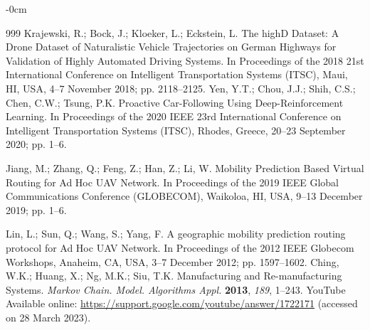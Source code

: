 \documentclass[sensors,article,accept,moreauthors,pdftex]{Definitions/mdpi}
\begin{document}
\begin{adjustwidth}{-\extralength}{0cm}
\begin{thebibliography}{999}
Krajewski, R.; Bock, J.; Kloeker, L.; Eckstein, L. The highD Dataset: A Drone Dataset of Naturalistic Vehicle Trajectories on German Highways for Validation of Highly Automated Driving Systems. In Proceedings of the 2018 21st International Conference on Intelligent Transportation Systems (ITSC), Maui, HI, USA, 4--7 November 2018; pp. 2118--2125.
Yen, Y.T.; Chou, J.J.; Shih, C.S.; Chen, C.W.; Tsung, P.K. Proactive Car-Following Using Deep-Reinforcement Learning. In Proceedings of the 2020 IEEE 23rd International Conference on Intelligent Transportation Systems (ITSC), Rhodes, Greece, 20--23 September 2020; pp. 1--6.

Jiang, M.; Zhang, Q.; Feng, Z.; Han, Z.; Li, W. Mobility Prediction Based Virtual Routing for Ad Hoc UAV Network. In Proceedings of the 2019 IEEE Global Communications Conference (GLOBECOM), Waikoloa, HI, USA, 9--13 December 2019; pp. 1--6.

Lin, L.; Sun, Q.; Wang, S.; Yang, F. A geographic mobility prediction routing protocol for Ad Hoc UAV Network.  In Proceedings of the  2012 IEEE Globecom Workshops, Anaheim, CA, USA, 3--7 December 2012; pp. 1597--1602.
Ching, W.K.; Huang, X.; Ng, M.K.; Siu, T.K. Manufacturing and Re-manufacturing Systems. \emph{Markov Chain. Model. Algorithms Appl.} \textbf{2013}, \emph{189}, 1--243.
\bibitem
{YouTube}  Available online:  \url{https://support.google.com/youtube/answer/1722171}  (accessed on 28 March 2023). 


\end{thebibliography}
\PublishersNote{}
\end{adjustwidth}
\end{document}

